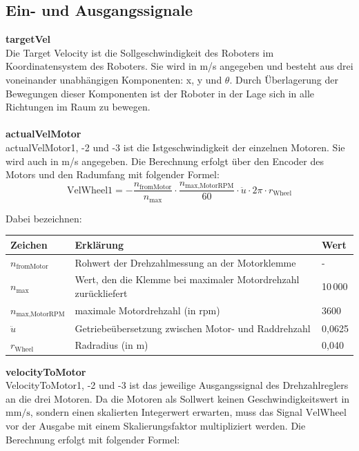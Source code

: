 \subsection{Ein- und Ausgangssignale}
\textbf{targetVel}\\
Die Target Velocity ist die Sollgeschwindigkeit des Roboters im Koordinatensystem des Roboters. Sie wird in m/s angegeben und besteht aus drei voneinander unabhängigen Komponenten: x, y und $\theta$. Durch Überlagerung der Bewegungen dieser Komponenten ist der Roboter in der Lage sich in alle Richtungen im Raum zu bewegen.\\
\\
\textbf{actualVelMotor}\\
actualVelMotor1, -2 und -3 ist die Istgeschwindigkeit der einzelnen Motoren. Sie wird auch in m/s angegeben. Die Berechnung erfolgt über den Encoder des Motors und den Radumfang mit folgender Formel:
\begin{equation}
    \text{VelWheel1} = -\frac{n_{\text{fromMotor}}}{n_{\text{max}}} \cdot \frac{n_{\text{max,MotorRPM}}}{60} \cdot \ddot{u} \cdot 2\pi \cdot r_{\text{Wheel}}
\end{equation}

Dabei bezeichnen:
\begin{table}[H]
    \centering    
    \label{tab:VelWheel_Formelzeichen}
    \begin{tabularx}{\textwidth}{|l|X|l|}
        \hline
        \textbf{Zeichen} & \textbf{Erklärung} & \textbf{Wert} \\
        \hline
        $n_{\text{fromMotor}}$ & Rohwert der Drehzahlmessung an der Motorklemme & - \\
        \hline
        $n_{\text{max}}$ & Wert, den die Klemme bei maximaler Motordrehzahl zurückliefert & 10\,000 \\
        \hline
        $n_{\text{max,MotorRPM}}$ & maximale Motordrehzahl (in rpm) & 3600 \\
        \hline
        $\ddot{u}$ & Getriebeübersetzung zwischen Motor- und Raddrehzahl & 0{,}0625 \\
        \hline
        $r_{\text{Wheel}}$ & Radradius (in m) & 0,040 \\
        \hline
    \end{tabularx}
\end{table}


\textbf{velocityToMotor}\\
VelocityToMotor1, -2 und -3 ist das jeweilige Ausgangssignal des Drehzahlreglers an die drei Motoren. Da die Motoren als Sollwert keinen Geschwindigkeitswert in $\text{mm/s}$, sondern einen skalierten Integerwert erwarten, muss das Signal $\text{VelWheel}$ vor der Ausgabe mit einem Skalierungsfaktor multipliziert werden. Die Berechnung erfolgt mit folgender Formel:

